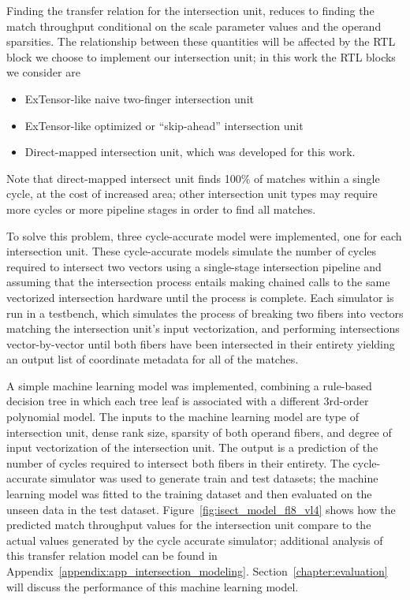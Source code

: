 Finding the transfer relation for the intersection unit, reduces to finding the match throughput conditional on the scale parameter values and the operand sparsities. The relationship between these quantities will be affected by the RTL block we choose to implement our intersection unit; in this work the RTL blocks we consider are

\begin{itemize}
    \item ExTensor-like naive two-finger intersection unit\cite{extensor}
    \item ExTensor-like optimized or ``skip-ahead'' intersection unit\cite{extensor}
    \item Direct-mapped intersection unit, which was developed for this work.
\end{itemize}

Note that direct-mapped intersect unit finds 100\% of matches within a single cycle, at the cost of increased area; other intersection unit types may require more cycles or more pipeline stages in order to find all matches.

To solve this problem, three cycle-accurate model were implemented, one for each intersection unit. These cycle-accurate models simulate the number of cycles required to intersect two vectors using a single-stage intersection pipeline and assuming that the intersection process entails making chained calls to the same vectorized intersection hardware until the process is complete. Each simulator is run in a testbench, which simulates the process of breaking two fibers into vectors matching the intersection unit's input vectorization, and performing intersections vector-by-vector until both fibers have been intersected in their entirety yielding an output list of coordinate metadata for all of the matches.

A simple machine learning model was implemented, combining a rule-based decision tree in which each tree leaf is associated with a different 3rd-order polynomial model. The inputs to the machine learning model are type of intersection unit, dense rank size, sparsity of both operand fibers, and degree of input vectorization of the intersection unit. The output is a prediction of the number of cycles required to intersect both fibers in their entirety. The cycle-accurate simulator was used to generate train and test datasets; the machine learning model was fitted to the training dataset and then evaluated on the unseen data in the test dataset. Figure~\ref{fig:isect_model_fl8_vl4} shows how the predicted match throughput values for the intersection unit compare to the actual values generated by the cycle accurate simulator; additional analysis of this transfer relation model can be found in Appendix~\ref{appendix:app_intersection_modeling}. Section~\ref{chapter:evaluation} will discuss the performance of this machine learning model.

